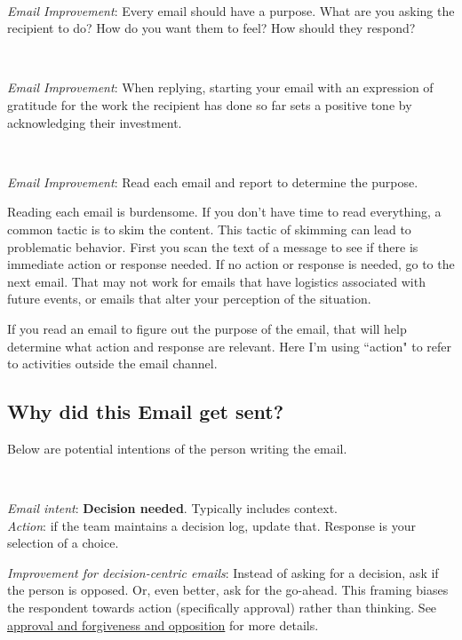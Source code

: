 \ \\
\begin{samepage}
\textit{Email Improvement}: Every email should have a purpose. What are you asking the recipient to do? How do you want them to feel? How should they respond?
\end{samepage}

\ \\
\begin{samepage}
\textit{Email Improvement}: When replying, starting your email with an expression of gratitude for the work the recipient has done so far sets a positive tone by acknowledging their investment.
\end{samepage}

\ \\
\begin{samepage}
\textit{Email Improvement}: Read each email and report to determine the purpose. 
\end{samepage}

Reading each email is burdensome. If you don't have time to read everything, a common tactic is to skim the content. 
This tactic of skimming can lead to problematic behavior. First you scan the text of a message to see if there is immediate action or response needed. If no action or response is needed, go to the next email. 
That may not work for emails that have logistics associated with future events, or emails that alter your perception of the situation.

If you read an email to figure out the purpose of the email, that will help determine what action and response are relevant. Here I'm using ``action" to refer to activities outside the email channel. 


\subsection*{Why did this Email get sent?}
Below are potential intentions of the person writing the email. 

\ \\
\begin{samepage}
\textit{Email intent}: \textbf{Decision needed}. Typically includes context. \\
\textit{Action}: if the team maintains a decision log, update that.
Response is your selection of a choice.
\end{samepage}

\textit{Improvement for decision-centric emails}: Instead of asking for a decision, ask if the person is opposed. Or, even better, ask for the go-ahead. 
This framing biases the respondent towards action (specifically approval) rather than thinking. 
See 
\hyperref[sec:approval-forgiveness-opposition]{approval and forgiveness and opposition}
%
for more details.

